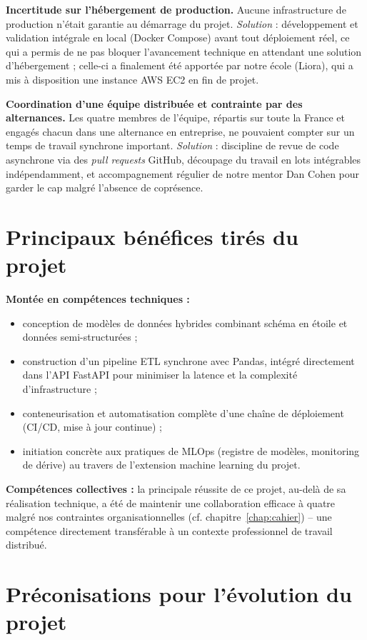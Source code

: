 \documentclass[11pt,a4paper]{report}
\begin{document}
\textbf{Incertitude sur l'hébergement de production.} Aucune infrastructure de production n'était garantie au démarrage du projet. \emph{Solution} : développement et validation intégrale en local (Docker Compose) avant tout déploiement réel, ce qui a permis de ne pas bloquer l'avancement technique en attendant une solution d'hébergement ; celle-ci a finalement été apportée par notre école (Liora), qui a mis à disposition une instance AWS EC2 en fin de projet.

\textbf{Coordination d'une équipe distribuée et contrainte par des alternances.} Les quatre membres de l'équipe, répartis sur toute la France et engagés chacun dans une alternance en entreprise, ne pouvaient compter sur un temps de travail synchrone important. \emph{Solution} : discipline de revue de code asynchrone via des \emph{pull requests} GitHub, découpage du travail en lots intégrables indépendamment, et accompagnement régulier de notre mentor Dan Cohen pour garder le cap malgré l'absence de coprésence.

\section{Principaux bénéfices tirés du projet}

\textbf{Montée en compétences techniques :}
\begin{itemize}
  \item conception de modèles de données hybrides combinant schéma en étoile et données semi-structurées ;
  \item construction d'un pipeline ETL synchrone avec Pandas, intégré directement dans l'API FastAPI pour minimiser la latence et la complexité d'infrastructure ;
  \item conteneurisation et automatisation complète d'une chaîne de déploiement (CI/CD, mise à jour continue) ;
  \item initiation concrète aux pratiques de MLOps (registre de modèles, monitoring de dérive) au travers de l'extension machine learning du projet.
\end{itemize}

\textbf{Compétences collectives :} la principale réussite de ce projet, au-delà de sa réalisation technique, a été de maintenir une collaboration efficace à quatre malgré nos contraintes organisationnelles (cf. chapitre~\ref{chap:cahier}) -- une compétence directement transférable à un contexte professionnel de travail distribué.

\section{Préconisations pour l'évolution du projet}
\label{sec:preconisations}
\end{document}
